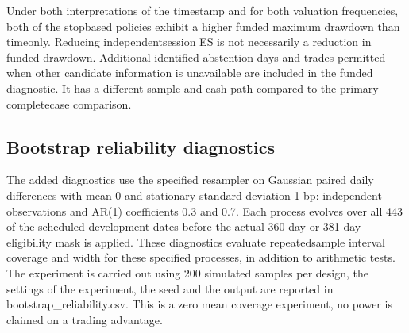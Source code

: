 \documentclass[11pt,a4paper]{article}
\begin{document}
\begin{minipage}{\linewidth}
\par{}
\end{minipage}\par\addvspace{8pt}

Under both interpretations of the timestamp and for both valuation frequencies, both of the stop\allowbreak{}based policies exhibit a higher funded maximum drawdown than time\allowbreak{}only. Reducing independent\allowbreak{}session ES is not necessarily a reduction in funded drawdown. Additional identified abstention days and trades permitted when other candidate information is unavailable are included in the funded diagnostic. It has a different sample and cash path compared to the primary complete\allowbreak{}case comparison.

\subsection*{Bootstrap reliability diagnostics}

The added diagnostics use the specified resampler on Gaussian paired daily differences with mean 0 and stationary standard deviation 1 bp: independent observations and AR(1) coefficients 0.3 and 0.7. Each process evolves over all 443 of the scheduled development dates before the actual 360 day or 381 day eligibility mask is applied. These diagnostics evaluate repeated\allowbreak{}sample interval coverage and width for these specified processes, in addition to arithmetic tests. The experiment is carried out using 200 simulated samples per design, the settings of the experiment, the seed and the output are reported in bootstrap\_reliability.csv. This is a zero mean coverage experiment, no power is claimed on a trading advantage.
\end{document}

